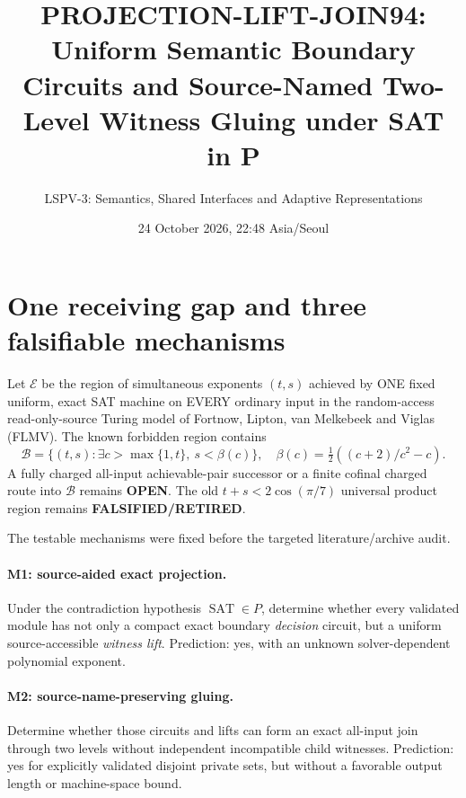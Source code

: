 \documentclass[11pt]{article}
\title{PROJECTION-LIFT-JOIN94: Uniform Semantic Boundary Circuits and Source-Named Two-Level Witness Gluing under SAT in P}
\author{LSPV-3: Semantics, Shared Interfaces and Adaptive Representations}
\date{24 October 2026, 22:48 Asia/Seoul}
\newcommand{\SAT}{\operatorname{SAT}}
\newcommand{\OPEN}{\textbf{OPEN}}
\begin{document}
\maketitle
\begin{center}
\end{center}

\section{One receiving gap and three falsifiable mechanisms}
Let \(\mathcal E\) be the region of simultaneous exponents \((t,s)\) achieved by ONE fixed uniform, exact SAT machine on EVERY ordinary input in the random-access read-only-source Turing model of Fortnow, Lipton, van Melkebeek and Viglas (FLMV). The known forbidden region contains
\[
\mathcal B=\{(t,s):\exists c>\max\{1,t\},\
s<\beta(c)\},\quad
\beta(c)=\tfrac12((c+2)/c^2-c).
\]
A fully charged all-input achievable-pair successor or a finite cofinal charged route into \(\mathcal B\) remains \OPEN. The old \(t+s<2\cos(\pi/7)\) universal product region remains \textbf{FALSIFIED/RETIRED}.

The testable mechanisms were fixed before the targeted literature/archive audit.
\paragraph{M1: source-aided exact projection.} Under the contradiction hypothesis \(\SAT\in P\), determine whether every validated module has not only a compact exact boundary \emph{decision} circuit, but a uniform source-accessible \emph{witness lift}. Prediction: yes, with an unknown solver-dependent polynomial exponent.
\paragraph{M2: source-name-preserving gluing.} Determine whether those circuits and lifts can form an exact all-input join through two levels without independent incompatible child witnesses. Prediction: yes for explicitly validated disjoint private sets, but without a favorable output length or machine-space bound.
\end{document}
